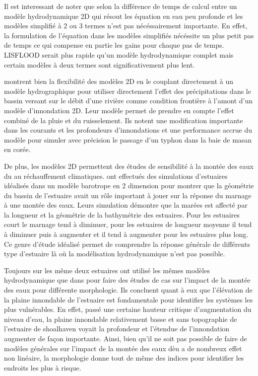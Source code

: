 \documentclass[12pt]{article}   %
\begin{document}
    Il est interessant de noter que selon \cite{Neelz2013} la différence de temps de calcul entre un modèle hydrodynamique 2D qui résout les équation en eau peu profonde et les modèles simplifié à 2 ou 3 termes n'est pas nécéssairement importante. En effet, la formulation de l'équation dans les modèles simplifiés nécéssite un plus petit pas de temps ce qui compense en partie les gains pour chaque pas de temps. LISFLOOD serait plus rapide qu'un modèle hydrodynamique complet mais certain modèles à deux termes sont significativement plus lent.  
    
    \cite{Lee2019} montrent bien la flexibilité des modèles 2D en le couplant directement à un modèle hydrographique pour utiliser directement l'effet des précipitations dans le bassin versant sur le débit d'une rivière comme condition frontière à l'amont d'un modèle d'innondation 2D. Leur modèle permet de prendre en compte l'effet combiné de la pluie et du ruisselement. Ils notent une modification importante dans les courants et les profondeurs d'innondations et une performance accrue du modèle pour simuler avec précision le passage d'un typhon dans la baie de masan en corée. 
    
    De plus, les modèles 2D permettent des études de sensibilité à la montée des eaux du au réchauffement climatiques. \cite{Du2018} ont effectués des simulations d'estuaires idéalisés dans un modèle barotrope en 2 dimension pour montrer que la géométrie du bassin de l'estuaire avait un rôle important à jouer sur la réponse du marnage à une montée des eaux. Leurs simulation démontre que la marées est affecté par la longueur et la géométrie de la bathymétrie des estuaires. Pour les estuaires court le marnage tend à diminuer, pour les estuaires de longueur moyenne il tend à diminuer puis à augmenter et il tend à augmenter pour les estuaires plus long. Ce genre d'étude idéalisé permet de comprendre la réponse générale de différents type d'estuaire là où la modélisation hydrodynamique n'est pas possible. 
    
    Toujours sur les même deux estuaires \cite{Kumbier20182} ont utilisé les mêmes modèles hydrodynamique que dans \cite{Kumbier2019} pour faire des études de cas sur l'impact de la montée des eaux pour différente morphologie. Ils concluent quant à eux que l'élévation de la plaine innondable de l'estuaire est fondamentale pour identifier les systèmes les plus vulnérables. En effet, passé une certaine hauteur critique d'augmentation du niveau d'eau, la plaine innondable relativement basse et sans topographie de l'estuaire de shoalhaven voyait la profondeur et l'étendue de l'innondation augmenter de façon importante. Ainsi, bien qu'il ne soit pas possible de faire de modèles générales sur l'impact de la montée des eaux dèu a de nombreux effet non linéaire, la morphologie donne tout de même des indices pour identifier les endroits les plus à risque. 
    
\end{document}
